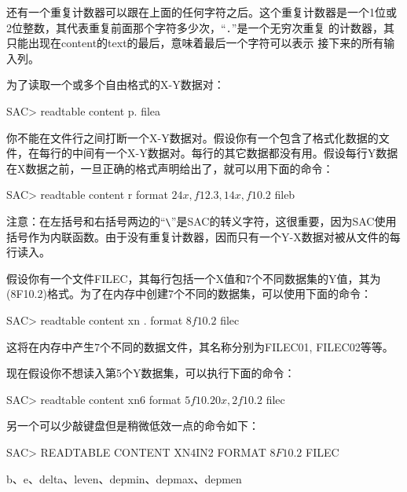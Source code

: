 还有一个重复计数器可以跟在上面的任何字符之后。这个重复计数器是一个1位或
2位整数，其代表重复前面那个字符多少次，``\texttt{.}''是一个无穷次重复
的计数器，其只能出现在content的text的最后，意味着最后一个字符可以表示
接下来的所有输入列。

为了读取一个或多个自由格式的X-Y数据对：
\begin{SACCode}
SAC> readtable content p. filea
\end{SACCode}

你不能在文件行之间打断一个X-Y数据对。假设你有一个包含了格式化数据的文件，在每行的中间有一个X-Y数据对。每行的其它数据都没有用。假设每行Y数据在X数据之前，一旦正确的格式声明给出了，就可以用下面的命令：
\begin{SACCode}
SAC> readtable content r format \(24x,f12.3,14x,f10.2\) fileb
\end{SACCode}
注意：在左括号和右括号两边的``\verb|\|''是SAC的转义字符，这很重要，因为SAC使用括号作为内联函数。由于没有重复计数器，因而只有一个Y-X数据对被从文件的每行读入。

假设你有一个文件FILEC，其每行包括一个X值和7个不同数据集的Y值，其为(8F10.2)格式。为了在内存中创建7个不同的数据集，可以使用下面的命令：
\begin{SACCode}
SAC> readtable content xn . format \(8f10.2\) filec
\end{SACCode}
这将在内存中产生7个不同的数据文件，其名称分别为FILEC01, FILEC02等等。

现在假设你不想读入第5个Y数据集，可以执行下面的命令：
\begin{SACCode}
SAC> readtable content xn6 format \(5f10.20x,2f10.2\) filec
\end{SACCode}
另一个可以少敲键盘但是稍微低效一点的命令如下：
\begin{SACCode}
SAC> READTABLE CONTENT XN4IN2 FORMAT \(8F10.2\) FILEC
\end{SACCode}

b、e、delta、leven、depmin、depmax、depmen
